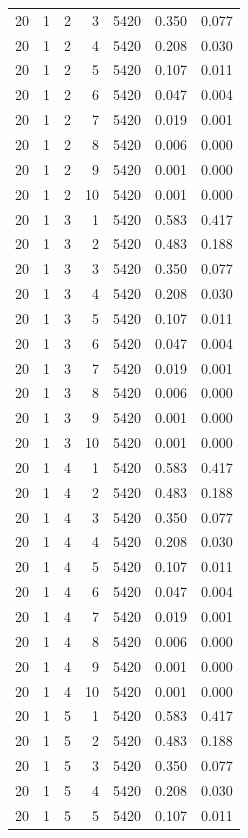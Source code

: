 \begin{table}
\begin{tabular}{rrrrrrr}
20 & 1 & 2 & 3 & 5420 & 0.350 & 0.077 \\
20 & 1 & 2 & 4 & 5420 & 0.208 & 0.030 \\
20 & 1 & 2 & 5 & 5420 & 0.107 & 0.011 \\
20 & 1 & 2 & 6 & 5420 & 0.047 & 0.004 \\
20 & 1 & 2 & 7 & 5420 & 0.019 & 0.001 \\
20 & 1 & 2 & 8 & 5420 & 0.006 & 0.000 \\
20 & 1 & 2 & 9 & 5420 & 0.001 & 0.000 \\
20 & 1 & 2 & 10 & 5420 & 0.001 & 0.000 \\
20 & 1 & 3 & 1 & 5420 & 0.583 & 0.417 \\
20 & 1 & 3 & 2 & 5420 & 0.483 & 0.188 \\
20 & 1 & 3 & 3 & 5420 & 0.350 & 0.077 \\
20 & 1 & 3 & 4 & 5420 & 0.208 & 0.030 \\
20 & 1 & 3 & 5 & 5420 & 0.107 & 0.011 \\
20 & 1 & 3 & 6 & 5420 & 0.047 & 0.004 \\
20 & 1 & 3 & 7 & 5420 & 0.019 & 0.001 \\
20 & 1 & 3 & 8 & 5420 & 0.006 & 0.000 \\
20 & 1 & 3 & 9 & 5420 & 0.001 & 0.000 \\
20 & 1 & 3 & 10 & 5420 & 0.001 & 0.000 \\
20 & 1 & 4 & 1 & 5420 & 0.583 & 0.417 \\
20 & 1 & 4 & 2 & 5420 & 0.483 & 0.188 \\
20 & 1 & 4 & 3 & 5420 & 0.350 & 0.077 \\
20 & 1 & 4 & 4 & 5420 & 0.208 & 0.030 \\
20 & 1 & 4 & 5 & 5420 & 0.107 & 0.011 \\
20 & 1 & 4 & 6 & 5420 & 0.047 & 0.004 \\
20 & 1 & 4 & 7 & 5420 & 0.019 & 0.001 \\
20 & 1 & 4 & 8 & 5420 & 0.006 & 0.000 \\
20 & 1 & 4 & 9 & 5420 & 0.001 & 0.000 \\
20 & 1 & 4 & 10 & 5420 & 0.001 & 0.000 \\
20 & 1 & 5 & 1 & 5420 & 0.583 & 0.417 \\
20 & 1 & 5 & 2 & 5420 & 0.483 & 0.188 \\
20 & 1 & 5 & 3 & 5420 & 0.350 & 0.077 \\
20 & 1 & 5 & 4 & 5420 & 0.208 & 0.030 \\
20 & 1 & 5 & 5 & 5420 & 0.107 & 0.011 \\

\end{tabular}
\end{table}

